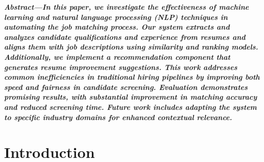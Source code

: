 \documentclass[a4paper]{article}
\begin{document}
\begin{multicols}{2}
\setlength{\columnsep}{0.5cm}


\textbf{\textit{Abstract—In this paper, we investigate the effectiveness of machine learning and natural language processing (NLP) techniques in automating the job matching process. Our system extracts and analyzes candidate qualifications and experience from resumes and aligns them with job descriptions using similarity and ranking models. Additionally, we implement a recommendation component that generates resume improvement suggestions. This work addresses common inefficiencies in traditional hiring pipelines by improving both speed and fairness in candidate screening. Evaluation demonstrates promising results, with substantial improvement in matching accuracy and reduced screening time. Future work includes adapting the system to specific industry domains for enhanced contextual relevance.}}







\section{Introduction}


\end{multicols}
\end{document}
